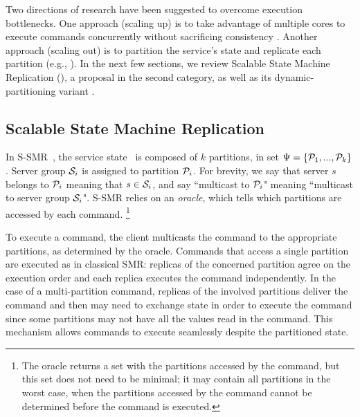 Two directions of research have been suggested to overcome execution bottlenecks. One approach (scaling up) is to take advantage of multiple cores to execute commands concurrently without sacrificing consistency \cite{Kapritsos:2012um,Marandi:2014bj,Kotla:2004ep,Guo:2014jp}.
Another approach (scaling out) is to partition the service's state and replicate each partition (e.g., \cite{Glendenning:2011kj,Marandi:2011dj}). In the next few sections, we review Scalable State Machine Replication (\ssmr), a proposal in the second category, as well as its dynamic-partitioning variant \dssmr.

\subsection{Scalable State Machine Replication}
\label{sec:ssmr}

In S-SMR~\cite{bezerra2014ssmr}, the service state \vvt\ is composed of $k$ partitions, in set $\Psi = \{\mathcal{P}_1, ..., \mathcal{P}_k\}$. Server group $\mathcal{S}_i$ is assigned to partition $\mathcal{P}_i$. For brevity, we say that server $s$ belongs to $\mathcal{P}_i$ meaning that $s \in \mathcal{S}_i$, and say ``multicast to $\mathcal{P}_i$" meaning ``multicast to server group $\mathcal{S}_i$".
S-SMR relies on an \emph{oracle}, which tells which partitions are accessed by each command.%
\footnote{The oracle returns a set with the partitions accessed by the command, but this set does not need to be minimal; it may contain all partitions in the worst case, when the partitions accessed by the command cannot be determined before the command is executed.}

To execute a command, the client multicasts the command to the appropriate partitions, as determined by the oracle.
Commands that access a single partition are executed as in classical SMR: replicas of the concerned partition agree on the execution order and each replica executes the command independently.
In the case of a multi-partition command, replicas of the involved partitions deliver the command and then may need to exchange state in order to execute the command since some partitions may not have all the values read in the command.
This mechanism allows commands to execute seamlessly despite the partitioned state.

%


